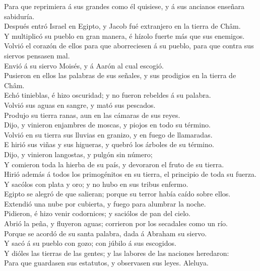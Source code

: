  Para que reprimiera á sus grandes como él quisiese, y á
sus ancianos enseñara sabiduría.\\
 Después entró Israel en Egipto, y Jacob fué extranjero en
la tierra de Châm.\\
 Y multiplicó su pueblo en gran manera, é hízolo fuerte más
que sus enemigos.\\
 Volvió el corazón de ellos para que aborreciesen á su
pueblo, para que contra sus siervos pensasen mal.\\
 Envió á su siervo Moisés, y á Aarón al cual escogió.\\
 Pusieron en ellos las palabras de sus señales, y sus
prodigios en la tierra de Châm.\\
 Echó tinieblas, é hizo oscuridad; y no fueron rebeldes á
su palabra.\\
 Volvió sus aguas en sangre, y mató sus pescados.\\
 Produjo su tierra ranas, aun en las cámaras de sus
reyes.\\
 Dijo, y vinieron enjambres de moscas, y piojos en todo su
término.\\
 Volvió en su tierra sus lluvias en granizo, y en fuego de
llamaradas.\\
 E hirió sus viñas y sus higueras, y quebró los árboles de
su término.\\
 Dijo, y vinieron langostas, y pulgón sin número;\\
 Y comieron toda la hierba de su país, y devoraron el fruto
de su tierra.\\
 Hirió además á todos los primogénitos en su tierra, el
principio de toda su fuerza.\\
 Y sacólos con plata y oro; y no hubo en sus tribus
enfermo.\\
 Egipto se alegró de que salieran; porque su terror había
caído sobre ellos.\\
 Extendió una nube por cubierta, y fuego para alumbrar la
noche.\\
 Pidieron, é hizo venir codornices; y saciólos de pan del
cielo.\\
 Abrió la peña, y fluyeron aguas; corrieron por los
secadales como un río.\\
 Porque se acordó de su santa palabra, dada á Abraham su
siervo.\\
 Y sacó á su pueblo con gozo; con júbilo á sus escogidos.\\
 Y dióles las tierras de las gentes; y las labores de las
naciones heredaron:\\
 Para que guardasen sus estatutos, y observasen sus leyes.
Aleluya.


